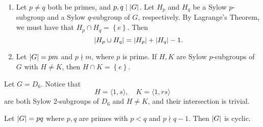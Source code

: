 \documentclass[notoc,notitlepage,nobib]{tufte-book}
\begin{document}
\begin{remark}
  \begin{enumerate}
    \item Let $p \neq q$ both be primes, and $p, q \mid \left| G \right|$. Let
      $H_p$ and $H_q$ be a Sylow $p$-subgroup and a Sylow $q$-subgroup of $G$,
      respectively. By Lagrange's Theorem, we must have that
      $H_p \cap H_q = \left\{ e \right\}$. Then
      \begin{equation*}
        \left| H_p \cup H_q \right| = \left| H_p \right| + \left| H_q \right| - 1.
      \end{equation*}

    \item Let $\left| G \right| = pm$ and $p \nmid m$, where $p$ is prime. If $H, K$ are
      Sylow $p$-subgroups of $G$ with $H \neq K$, then $H \cap K = \left\{ e \right\}$.
  \end{enumerate}
\end{remark}

\begin{eg}
  Let $G = D_6$. Notice that
  \begin{equation*}
    H = \langle 1, s \rangle, \quad K = \langle 1, rs \rangle
  \end{equation*}
  are both Sylow $2$-subgroups of $D_6$ and $H \neq K$, and their intersection is
  trivial.
\end{eg}

\begin{eg}
  Let $\left| G \right| = pq$ where $p, q$ are primes with $p < q$ and $p \nmid q - 1$.
  Then $\left|G\right|$ is cyclic.
\end{eg}
\end{document}
